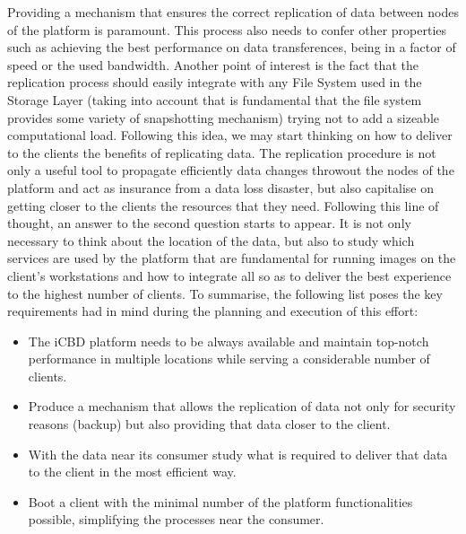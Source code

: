 Providing a mechanism that ensures the correct replication of data between nodes of the platform is paramount. This process also needs to confer other properties such as achieving the best performance on data transferences, being in a factor of speed or the used bandwidth. Another point of interest is the fact that the replication process should easily integrate with any File System used in the Storage Layer (taking into account that is fundamental that the file system provides some variety of snapshotting mechanism) trying not to add a sizeable computational load.
Following this idea, we may start thinking on how to deliver to the clients the benefits of replicating data. The replication procedure is not only a useful tool to propagate efficiently data changes throwout the nodes of the platform and act as insurance from a data loss disaster, but also capitalise on getting closer to the clients the resources that they need. Following this line of thought, an answer to the second question starts to appear. It is not only necessary to think about the location of the data, but also to study which services are used by the platform that are fundamental for running images on the client's workstations and how to integrate all so as to deliver the best experience to the highest number of clients.
To summarise, the following list poses the key requirements had in mind during the planning and execution of this effort:

\begin{itemize}
    \item The iCBD platform needs to be always available and maintain top-notch performance in multiple locations while serving a considerable number of clients.
    \item Produce a mechanism that allows the replication of data not only for security reasons (backup) but also providing that data closer to the client.
    \item With the data near its consumer study what is required to deliver that data to the client in the most efficient way.
	\item Boot a client with the minimal number of the platform functionalities possible, simplifying the processes near the consumer.
\end{itemize}


